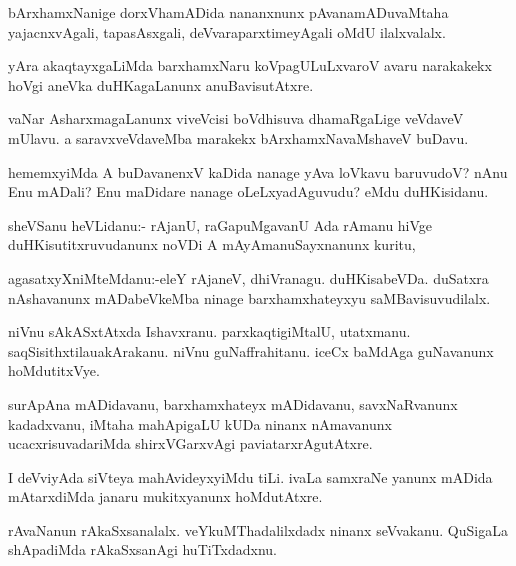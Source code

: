 \documentclass{article}
\begin{document}
\begin{mn}%
bArxhamxNanige dorxVhamADida nananxnunx pAvanamADuvaMtaha yajacnxvAgali, tapasAsxgali, 
deVvaraparxtimeyAgali oMdU ilalxvalalx.
\end{mn}

\begin{mn}%
yAra akaqtayxgaLiMda barxhamxNaru koVpagULuLxvaroV avaru narakakekx hoVgi aneVka 
duHKagaLanunx anuBavisutAtxre.
\end{mn}

\begin{mn}%
vaNar AsharxmagaLanunx viveVcisi boVdhisuva dhamaRgaLige veVdaveV mUlavu. a 
saravxveVdaveMba marakekx bArxhamxNavaMshaveV buDavu.
\end{mn}

\begin{mn}%
hememxyiMda A buDavanenxV kaDida nanage yAva loVkavu baruvudoV? nAnu Enu mADali? Enu 
maDidare nanage oLeLxyadAguvudu? eMdu duHKisidanu. 
\end{mn}

\begin{mn}%
sheVSanu heVLidanu:- rAjanU, raGapuMgavanU Ada rAmanu hiVge duHKisutitxruvudanunx noVDi A 
mAyAmanuSayxnanunx kuritu,
\end{mn}

\begin{mn}%
agasatxyXniMteMdanu:-eleY rAjaneV, dhiVranagu. duHKisabeVDa. duSatxra nAshavanunx 
mADabeVkeMba ninage barxhamxhateyxyu saMBavisuvudilalx.
\end{mn}

\begin{mn}%
niVnu sAkASxtAtxda Ishavxranu. parxkaqtigiMtalU, utatxmanu. saqSisithxtilauakArakanu. 
niVnu guNaffrahitanu. iceCx baMdAga guNavanunx hoMdutitxVye.
\end{mn}

\begin{mn}%
surApAna mADidavanu, barxhamxhateyx mADidavanu, savxNaRvanunx kadadxvanu, iMtaha 
mahApigaLU kUDa ninanx nAmavanunx ucacxrisuvadariMda shirxVGarxvAgi paviatarxrAgutAtxre.
\end{mn}

\begin{mn}%
I deVviyAda siVteya mahAvideyxyiMdu tiLi. ivaLa samxraNe yanunx mADida mAtarxdiMda janaru 
mukitxyanunx hoMdutAtxre.
\end{mn}

\begin{mn}%
rAvaNanun rAkaSxsanalalx. veYkuMThadalilxdadx ninanx seVvakanu. QuSigaLa shApadiMda 
rAkaSxsanAgi huTiTxdadxnu.
\end{mn}
\end{document}
